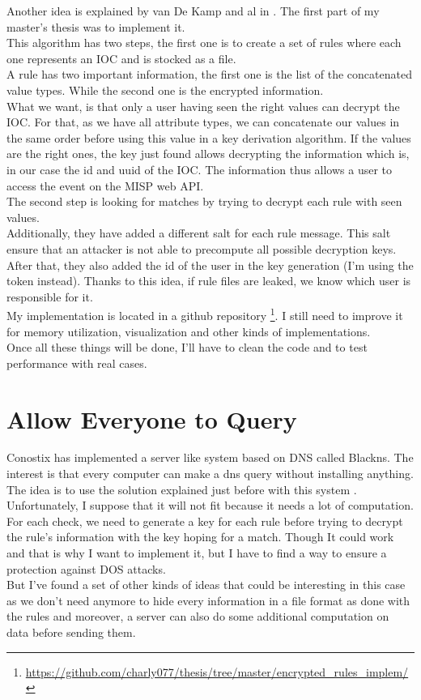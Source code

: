 \documentclass[10pt]{article}
\begin{document}
Another idea is explained by van De Kamp and al in \cite{van2016private}. The first part of my master's thesis was to implement it.\\
This algorithm has two steps, the first one is to create a set of rules where each one represents an IOC and is stocked as a file.\\
A rule has two important information, the first one is the list of the concatenated value types. While the second one is the encrypted information.\\
What we want, is that only a user having seen the right values can decrypt the IOC. For that, as we have all attribute types, we can concatenate our values in the same order before using this value in a key derivation algorithm. If the values are the right ones, the key just found allows decrypting the information which is, in our case the id and uuid of the IOC. The information thus allows a user to access the event on the MISP web API.\\
The second step is looking for matches by trying to decrypt each rule with seen values.\\

Additionally, they have added a different salt for each rule message. This salt ensure that an attacker is not able to precompute all possible decryption keys. After that, they also added the id of the user in the key generation (I'm using the token instead). Thanks to this idea, if rule files are leaked, we know which user is responsible for it.\\

My implementation is located in a github repository \footnote{\url{https://github.com/charly077/thesis/tree/master/encrypted_rules_implem/}}. I still need to improve it for memory utilization, visualization and other kinds of implementations.\\
Once all these things will be done, I'll have to clean the code and to test performance with real cases.

\section{Allow Everyone to Query}
Conostix has implemented a server like system based on DNS called Blackns. The interest is that every computer can make a dns query without installing anything. The idea is to use the solution explained just before with this system . Unfortunately, I suppose that it will not fit because it needs a lot of computation. For each check, we need to generate a key for each rule before trying to decrypt the rule's information with the key hoping for a match. Though It could work and that is why I want to implement it, but I have to find a way to ensure a protection against DOS attacks.\\
But I've found a set of other kinds of ideas that could be interesting in this case as we don't need anymore to hide every information in a file format as done with the rules and moreover, a server can also do some additional computation on data before sending them.
\end{document}
